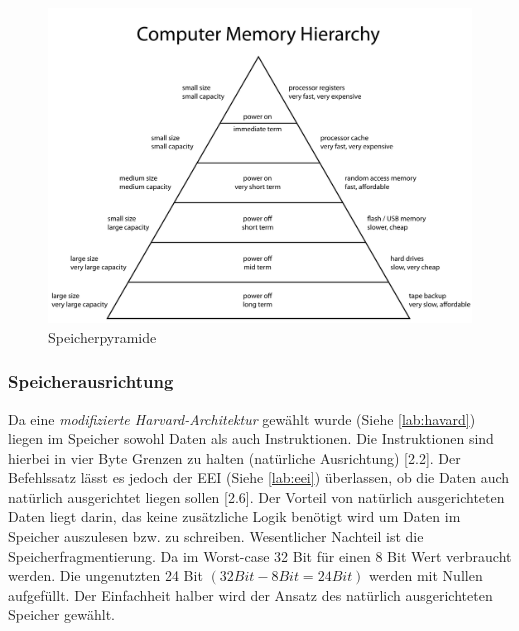                 \begin{figure}[H]
                    \centering
                    \includegraphics[scale=0.2]{img/speicherpyramide.png}
                    \caption[Speicherpyramide]{Speicherpyramide \cite{memory-hierarchy}}
                    \label{fig:memory-hierarchy}
                \end{figure}


            \subsubsection{Speicherausrichtung}\label{lab:mem-order}
                Da eine \textit{modifizierte Harvard-Architektur} gewählt wurde (Siehe \ref{lab:havard}) liegen im Speicher
                sowohl Daten als auch Instruktionen. Die Instruktionen sind hierbei in vier Byte Grenzen zu halten
                (natürliche Ausrichtung) \cite{riscv-isa-specs}[2.2].
                Der Befehlssatz lässt es jedoch der EEI (Siehe \ref{lab:eei}) überlassen, ob die Daten auch natürlich ausgerichtet liegen sollen
                \cite{riscv-isa-specs}[2.6].
                Der Vorteil von natürlich ausgerichteten Daten liegt darin, das keine zusätzliche Logik benötigt wird um Daten im Speicher
                auszulesen bzw. zu schreiben. Wesentlicher Nachteil ist die Speicherfragmentierung. Da im Worst-case 32 Bit für einen 8 Bit 
                Wert verbraucht werden. Die ungenutzten 24 Bit $(32 Bit - 8 Bit = 24 Bit)$ werden mit Nullen aufgefüllt.
                Der Einfachheit halber wird der Ansatz des natürlich ausgerichteten Speicher gewählt.

                





                
            
                
            
           
            
            

            

            



            
    
        

    
